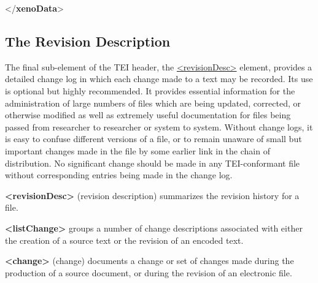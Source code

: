 \begin{shaded}
\hspace*{1em}\hspace*{1em}\mbox{}\newline 
\hspace*{1em}\mbox{}\newline 
{}\mbox{}\newline 
{</\textbf{xenoData}>}\end{shaded}\egroup\par 
\subsection[{The Revision Description}]{The Revision Description}\label{HD6}\par
The final sub-element of the TEI header, the \hyperref[TEI.revisionDesc]{<revisionDesc>} element, provides a detailed change log in which each change made to a text may be recorded. Its use is optional but highly recommended. It provides essential information for the administration of large numbers of files which are being updated, corrected, or otherwise modified as well as extremely useful documentation for files being passed from researcher to researcher or system to system. Without change logs, it is easy to confuse different versions of a file, or to remain unaware of small but important changes made in the file by some earlier link in the chain of distribution. No significant change should be made in any TEI-conformant file without corresponding entries being made in the change log.
\begin{sansreflist}
  
\item [\textbf{<revisionDesc>}] (revision description) summarizes the revision history for a file.
\item [\textbf{<listChange>}] groups a number of change descriptions associated with either the creation of a source text or the revision of an encoded text.
\item [\textbf{<change>}] (change) documents a change or set of changes made during the production of a source document, or during the revision of an electronic file.
\end{sansreflist}
\par

